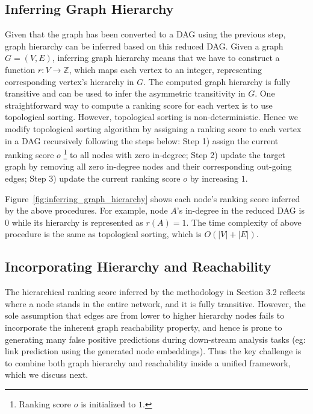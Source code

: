 \documentclass[letterpaper]{article} \usepackage{aaai19}  \usepackage{times}  \usepackage{helvet}  \usepackage{courier}  \usepackage{url}  \usepackage{graphicx}  \usepackage{booktabs} \usepackage{xcolor}
\begin{document}
\subsection{Inferring Graph Hierarchy}
\label{sec:inferring_graph_hierarchy}

Given that the graph has been converted to a DAG using the previous step, graph hierarchy can be inferred based on this reduced DAG. Given a graph $G = (V,E)$, inferring graph hierarchy means that we have to construct a function $r: V \rightarrow \mathbb{Z}$, which maps each vertex to an integer, representing corresponding vertex's hierarchy in $G$. The computed graph hierarchy is fully transitive and can be used to infer the asymmetric transitivity in $G$.
One straightforward way to compute a ranking score for each vertex is to use topological sorting. However, topological sorting is non-deterministic. Hence we modify topological sorting algorithm by assigning a ranking score to each vertex in a DAG recursively following the steps below: Step 1) assign the current ranking score $o$ \footnote{Ranking score $o$ is initialized to $1$.} to all nodes with zero in-degree; Step 2) update the target graph by removing all zero in-degree nodes and their corresponding out-going edges; Step 3) update the current ranking score $o$ by increasing $1$.



Figure~\ref{fig:inferring_graph_hierarchy} shows each node's ranking score inferred by the above procedures. For example, node $A$'s in-degree in the reduced DAG is $0$ while its hierarchy is represented as $r(A) = 1$. The time complexity of above procedure is the same as topological sorting, which is $O(|V|+|E|)$.




















\subsection{Incorporating Hierarchy and Reachability}
\label{sec:build_matrix}

The hierarchical ranking score inferred by the methodology in Section 3.2 reflects where a node stands in the entire network, and it is fully transitive. However, the sole assumption that edges are from lower to higher hierarchy nodes fails to incorporate the inherent graph reachability property, and hence is prone to generating many false positive predictions during down-stream analysis tasks (eg: link prediction using the generated node embeddings).
Thus the key challenge is to combine both graph hierarchy and reachability inside a unified framework, which we discuss next.
\end{document}
